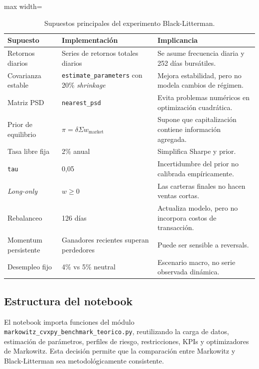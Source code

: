 \begin{table}[H]
\centering
\caption{Supuestos principales del experimento Black-Litterman.}
\label{tab:anexo4_bl_supuestos}
\small
\begin{adjustbox}{max width=\textwidth}
\begin{tabular}{@{}p{}p{}p{}@{}}
\toprule
Supuesto & Implementaci\'on & Implicancia \\
\midrule
Retornos diarios & Series de retornos totales diarios & Se asume frecuencia diaria y 252 d\'ias burs\'atiles. \\
Covarianza estable & \texttt{estimate\_parameters} con 20\% \textit{shrinkage} & Mejora estabilidad, pero no modela cambios de r\'egimen. \\
Matriz PSD & \texttt{nearest\_psd} & Evita problemas num\'ericos en optimizaci\'on cuadr\'atica. \\
Prior de equilibrio & $\pi = \delta\Sigma w_{\text{market}}$ & Supone que capitalizaci\'on contiene informaci\'on agregada. \\
Tasa libre fija & 2\% anual & Simplifica Sharpe y prior. \\
\texttt{tau} & 0,05 & Incertidumbre del prior no calibrada emp\'iricamente. \\
\textit{Long-only} & $w \geq 0$ & Las carteras finales no hacen ventas cortas. \\
Rebalanceo & 126 d\'ias & Actualiza modelo, pero no incorpora costos de transacci\'on. \\
Momentum persistente & Ganadores recientes superan perdedores & Puede ser sensible a reversals. \\
Desempleo fijo & 4\% vs 5\% neutral & Escenario macro, no serie observada din\'amica. \\
\bottomrule
\end{tabular}
\end{adjustbox}
\end{table}

\subsection*{Estructura del notebook}

El notebook importa funciones del m\'odulo
\texttt{markowitz\_cvxpy\_benchmark\_teorico.py}, reutilizando la carga de
datos, estimaci\'on de par\'ametros, perfiles de riesgo, restricciones, KPIs y
optimizadores de Markowitz. Esta decisi\'on permite que la comparaci\'on entre
Markowitz y Black-Litterman sea metodol\'ogicamente consistente.

